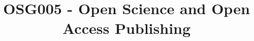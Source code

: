 \documentclass{article}
\begin{document}
\title{OSG005 - Open Science and Open Access Publishing }

\maketitle
\end{document}
